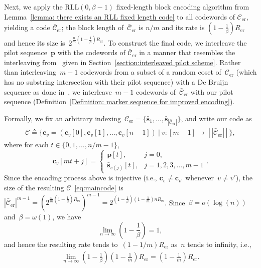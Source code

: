 \documentclass[journal,letterpaper,onecolumn,11pt]{IEEEtran}
\newcommand{\cC}{\mathcal{C}}
\newcommand{\boldc}{\mathbf{c}}
\newcommand{\bolds}{\mathbf{s}}
\begin{document}
Next, we apply the $\text{RLL}(0,\beta-1)$ fixed-length block encoding algorithm from Lemma~\ref{lemma: there exists an RLL fixed length code} to all codewords of $\cC_{\mathrm{er}}$, yielding a code $\bar{\cC}_{\mathrm{er}}$; the block length of~$\bar{\cC}_{\mathrm{er}}$ is $n/m$ and its rate is $(1-\frac{1}{\beta})R_{\mathrm{er}}$ and hence its size is~$2^{\frac{n}{m}(1-\frac{1}{\beta})R_{\mathrm{er}}}$.
To construct the final code, we interleave the pilot sequence~$\mathbf{p}$ with the codewords of $\bar{\cC}_{\mathrm{er}}$ in a manner that resembles the interleaving from~\cite{shomorony2021torn} given in Section~\ref{section:interleaved pilot scheme}. 
Rather than interleaving~$m-1$ codewords from a subset of a random coset of~$\cC_{\mathrm{er}}$ (which has no substring intersection with their pilot sequence) with a De Bruijn sequence as done in~\cite{shomorony2021torn}, we interleave~$m-1$ codewords of~$\bar{\cC}_{\mathrm{er}}$ with our pilot sequence (Definition~\ref{Definition: marker sequence for improved encoding}).

Formally, we fix an arbitrary indexing~$\bar{\cC}_{\mathrm{er}}=\{\bar{\bolds}_1,\ldots,\bar{\bolds}_{|\bar{\cC}_{\mathrm{er}}|}\}$, and write our code as
\begin{align}\label{eq:maincode}
   \mathcal{C}\triangleq \{\boldc_v=(\boldc_{v}[0], \boldc_{v}[1], \dots, \boldc_{v}[n-1])~\vert~v:[m-1]\to[|\bar{\cC}_{\mathrm{er}}|]\},
\end{align}
where for each $t \in \{0, 1, \dots, n/m-1\}$,
\begin{equation}\label{equation: interleved eq for local alignment}
    \boldc_{v}[mt+j] = 
    \begin{cases} 
    \mathbf{p}[t], & j = 0, \\
    \bar{\bolds}_{v(j)}[t], & j = 1, 2, 3, \dots, m-1
    \end{cases}.
\end{equation}
Since the encoding process above is injective (i.e., $\boldc_{v}\ne\boldc_{v'}$ whenever~$v\ne v'$), the size of the resulting $\mathcal{C}$~\eqref{eq:maincode} is $ |\bar{\cC}_{\mathrm{er}}|^{m-1}=(2^{\frac{n}{m}(1-\frac{1}{\beta})R_{\mathrm{er}}})^{m-1} = 2^{(1-\frac{1}{\beta})(1-\frac{1}{m})nR_{\mathrm{er}}}$.
Since~$\beta=o(\log(n))$ and~$\beta=\omega(1)$, we have $$\lim_{n\to\infty}\left(1-\frac{1}{\beta}\right)=1,$$ and hence the resulting rate tends to~$\left(1-1/m\right)R_{\mathrm{er}}$ as~$n$ tends to infinity, i.e., 
\begin{align}\label{equation:rate}
    \lim_{n\to\infty}\left(1-\frac{1}{\beta}\right)\left(1-\frac{1}{m}\right)R_{\mathrm{er}}=\left(1-\frac{1}{m}\right)R_{\mathrm{er}}.
\end{align}
\end{document}
